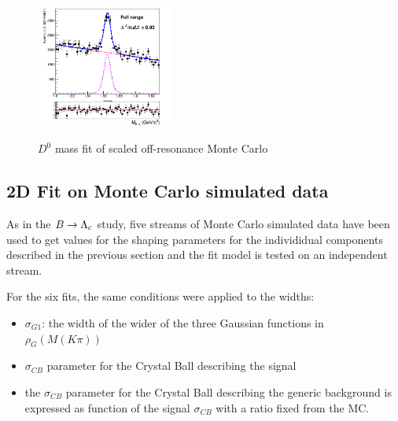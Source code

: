 \begin{figure}[H]
\centering
{\includegraphics[width=0.40\textwidth]{05-chargedControlSample/figs/InvMchargedControlD0_off-resonanceMC_rescaled_2Dfit_w_peak_frac.png}}
\caption{$D^0$ mass fit of scaled off-resonance  Monte Carlo}
\label{fig:InvMchargedControlD0_off-resonanceMC_rescaled_2Dfit_w_peak_frac}
\end{figure}

\subsection{2D Fit on Monte Carlo simulated data}\label{2Dfit_chargedControlD0_onMC}

As in the $B \rightarrow \Lambda_c$ study, five streams of Monte Carlo simulated data have been used to get values for the shaping parameters for the individidual components described in the previous section and the fit model is tested on 
an independent stream.
 
For the six fits, the same conditions were applied to the widths:
\begin{itemize}
      \item $\sigma_{G1}$: the width of the wider of the three Gaussian functions in $\rho_G(M(K \pi))$
      \item $\sigma_{CB}$ parameter for the Crystal Ball describing the signal
      \item the $\sigma_{CB}$ parameter for the Crystal Ball describing the generic background is expressed as function of the signal $\sigma_{CB}$  with a ratio fixed from the MC. 
\end{itemize}

